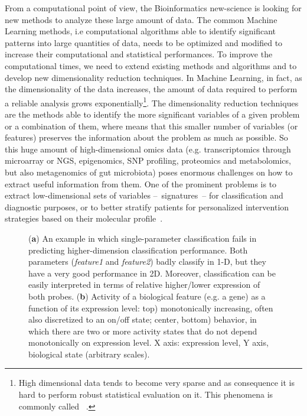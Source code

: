 \documentclass{standalone}
\begin{document}
From a computational point of view, the Bioinformatics new-science is looking for new methods to analyze these large amount of data.
The common Machine Learning methods, i.e computational algorithms able to identify significant patterns into large quantities of data, needs to be optimized and modified to increase their computational and statistical performances.
To improve the computational times, we need to extend existing methods and algorithms and to develop new dimensionality reduction techniques.
In Machine Learning, in fact, as the dimensionality of the data increases, the amount of data required to perform a reliable analysis grows exponentially\footnote{
  High dimensional data tends to become very sparse and as consequence it is hard to perform robust statistical evaluation on it.
  This phenomena is commonly called ~\cite{bellman1961adaptive}.
}.
The dimensionality reduction techniques are the methods able to identify the more significant variables of a given problem or a combination of them, where  means that this smaller number of variables (or features) preserves the information about the problem as much as possible.
So this huge amount of high-dimensional omics data (e.g. transcriptomics through microarray or NGS, epigenomics, SNP profiling, proteomics and metabolomics, but also metagenomics of gut microbiota) poses enormous challenges on how to extract useful information from them.
One of the prominent problems is to extract low-dimensional sets of variables –~signatures~– for classification and diagnostic purposes, or to better stratify patients for personalized intervention strategies based on their molecular profile~\cite{Scotlandi2009, Chan2011, Johnson2017, Beckmann2016ReconcilingEM}.


\begin{figure}[htbp]
\centering
\def\svgwidth{0.4\textwidth}

\qquad\qquad
\def\svgwidth{0.4\textwidth}

\caption{(\textbf{a}) An example in which single-parameter classification fails in predicting higher-dimension classification performance.
Both parameters (\emph{feature1} and \emph{feature2}) badly classify in 1-D, but they have a very good performance in 2D.
Moreover, classification can be easily interpreted in terms of relative higher/lower expression of both probes.
(\textbf{b}) Activity of a biological feature (e.g. a gene) as a function of its expression level:
top) monotonically increasing, often also discretized to an on/off state;
center, bottom)  behavior, in which there are two or more activity states that do not depend monotonically on expression level.
X axis: expression level, Y axis, biological state (arbitrary scales).
}
\label{fig:example}
\end{figure}
\end{document}
